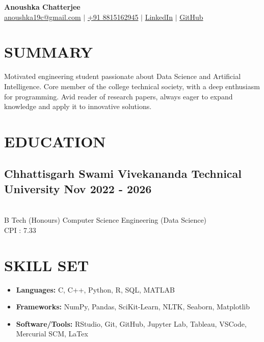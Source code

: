 \documentclass[a4paper,11pt]{article}
\begin{document}
\begin{center}
    {\Huge \textbf{Anoushka Chatterjee}} \\
    \vspace{5pt}
    \href{mailto:anoushka19c@gmail.com}{anoushka19c@gmail.com} $|$
    \href{tel:+918815162945}{+91 8815162945} $|$
    \href{https://www.linkedin.com/in/anoushkaacc}{LinkedIn} $|$
    \href{https://github.com/anoushkaacc}{GitHub} \\
\end{center}

\vspace{0.1cm}

\section*{SUMMARY}
Motivated engineering student passionate about Data Science and Artificial Intelligence. Core member of the college technical society, with a deep enthusiasm for programming. Avid reader of research papers, always eager to expand knowledge and apply it to innovative solutions.


\section*{EDUCATION}
\subsection{{Chhattisgarh Swami Vivekananda Technical University} \small\hfill Nov 2022 - 2026 } \\
B Tech (Honours) Computer Science Engineering (Data Science) \\
CPI : 7.33

\section*{SKILL SET}
\begin{itemize}
    \item \textbf{Languages:} C, C++, Python, R, SQL, MATLAB
    \item \textbf{Frameworks:} NumPy, Pandas, SciKit-Learn, NLTK, Seaborn, Matplotlib
    \item \textbf{Software/Tools:} RStudio, Git, GitHub, Jupyter Lab, Tableau, VSCode, Mercurial SCM, LaTex

\end{itemize}
\end{document}
